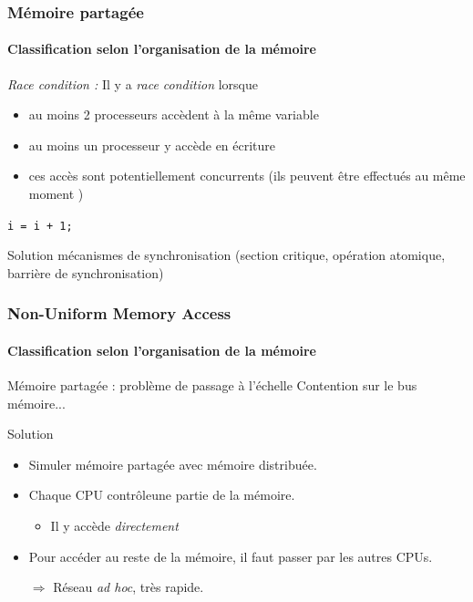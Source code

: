 \documentclass[xcolor={x11names,svgnames}]{beamer}
\begin{document}
\begin{frame}
  \frametitle{Mémoire partagée}
  \framesubtitle{Classification selon l'organisation de la mémoire}


  \begin{block}{{\it Race condition :}}
    Il y a {\it race condition} lorsque  
    \begin{itemize}
    \item au moins 2 processeurs accèdent à la même variable
    \item au moins un processeur y accède en écriture 
    \item ces accès sont potentiellement concurrents (ils peuvent
      être effectués \og au même moment \fg)
    \end{itemize}
  \end{block}
  
  \medskip
  
  \texttt{i = i + 1;}
  
  \medskip
  
  \begin{exampleblock}{Solution}
    mécanismes de synchronisation (section critique,
    opération atomique, barrière de synchronisation)
  \end{exampleblock}
\end{frame}



\begin{frame}
  \frametitle{Non-Uniform Memory Access}
  \framesubtitle{Classification selon l'organisation de la mémoire}

  \begin{alertblock}{Mémoire partagée : problème de passage à l'échelle}
    Contention sur le bus mémoire...
  \end{alertblock}

  \begin{exampleblock}{Solution}
    \begin{itemize}
    \item Simuler mémoire partagée avec mémoire distribuée.
    \item Chaque CPU \og contrôle\fg une partie de la mémoire.
      \begin{itemize}
      \item Il y accède \emph{directement}
      \end{itemize}
    \item Pour accéder au reste de la mémoire, il faut passer par les autres
      CPUs.
    \item[$\Rightarrow$] Réseau \textit{ad hoc}, très rapide.
    \end{itemize}
  \end{exampleblock}
\end{frame}
\end{document}
